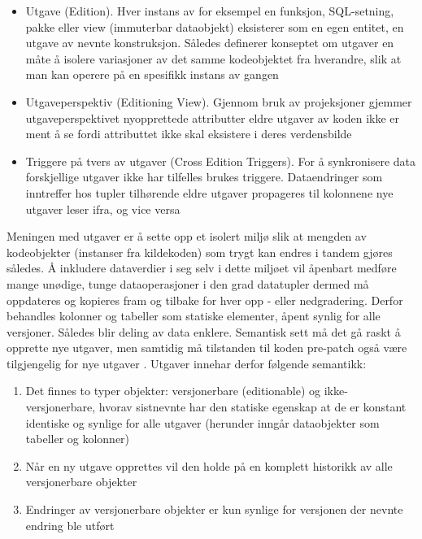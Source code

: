 \begin{itemize}
  \item Utgave (Edition). Hver instans av for eksempel en funksjon, SQL-setning, pakke eller view (immuterbar dataobjekt) eksisterer som en egen entitet, en utgave av nevnte konstruksjon. Således definerer konseptet om utgaver en måte å isolere variasjoner av det samme kodeobjektet fra hverandre, slik at man kan operere på en spesifikk instans av gangen
  \item Utgaveperspektiv (Editioning View). Gjennom bruk av projeksjoner gjemmer utgaveperspektivet nyopprettede attributter eldre utgaver av koden ikke er ment å se fordi attributtet ikke skal eksistere i deres verdensbilde
  \item Triggere på tvers av utgaver (Cross Edition Triggers). For å synkronisere data forskjellige utgaver ikke har tilfelles brukes triggere. Dataendringer som inntreffer hos tupler tilhørende eldre utgaver propageres til kolonnene nye utgaver leser ifra, og vice versa
\end{itemize}

Meningen med utgaver er å sette opp et isolert miljø slik at mengden av kodeobjekter (instanser fra kildekoden) som trygt kan endres i tandem gjøres således. Å inkludere dataverdier i seg selv i dette miljøet vil åpenbart medføre mange unødige, tunge dataoperasjoner i den grad datatupler dermed må oppdateres og kopieres fram og tilbake for hver opp - eller nedgradering. Derfor behandles kolonner og tabeller som statiske elementer, åpent synlig for alle versjoner. Således blir deling av data enklere. Semantisk sett må det gå raskt å opprette nye utgaver, men samtidig må tilstanden til koden pre-patch også være tilgjengelig for nye utgaver \citep{choi2009}. Utgaver innehar derfor følgende semantikk:

\begin{enumerate}
  \item Det finnes to typer objekter: versjonerbare (editionable) og ikke-versjonerbare, hvorav sistnevnte har den statiske egenskap at de er konstant identiske og synlige for alle utgaver (herunder inngår dataobjekter som tabeller og kolonner)
  \item Når en ny utgave opprettes vil den holde på en komplett historikk av alle versjonerbare objekter
  \item Endringer av versjonerbare objekter er kun synlige for versjonen der nevnte endring ble utført
\end{enumerate}


